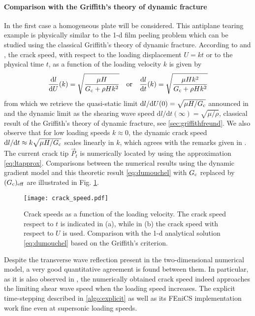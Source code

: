 \paragraph{Comparison with the Griffith's theory of dynamic fracture} In the first case a homogeneous plate will be considered. This antiplane tearing example is physically similar to the 1-d film peeling problem which can be studied using the classical Griffith's theory of dynamic fracture. According to \cite{DumouchelMarigoCharlotte:2008} and \cite{BourdinFrancfortMarigo:2008}, the crack speed, with respect to the loading displacement $U=kt$ or to the physical time $t$, as a function of the loading velocity $k$ is given by
\begin{equation} \label{eq:dumouchel}
\frac{\mathrm{d} l}{\mathrm{d} U}(k)=\sqrt{\frac{\mu H}{G_\mathrm{c}+\rho Hk^2}}\quad\text{or}\quad\frac{\mathrm{d} l}{\mathrm{d} t}(k)=\sqrt{\frac{\mu Hk^2}{G_\mathrm{c}+\rho Hk^2}}
\end{equation}
from which we retrieve the quasi-static limit $\mathrm{d} l/\mathrm{d} U(0)=\sqrt{\mu H/G_\mathrm{c}}$ announced in \cite{BourdinFrancfortMarigo:2008} and the dynamic limit as the shearing wave speed $\mathrm{d} l/\mathrm{d} t(\infty)=\sqrt{\mu/\rho}$, classical result of the Griffith's theory of dynamic fracture, see \cref{sec:griffithfreund}. We also observe that for low loading speeds $k\approx 0$, the dynamic crack speed $\mathrm{d} l/\mathrm{d} t\approx k\sqrt{\mu H/G_\mathrm{c}}$ scales linearly in $k$, which agrees with the remarks given in \cite{Bourdin:2011}. The current crack tip $\vec{P}_t$ is numerically located by using the approximation \eqref{eq:ltapprox}. Comparisons between the numerical results using the dynamic gradient model and this theoretic result \eqref{eq:dumouchel} with $G_\mathrm{c}$ replaced by $(G_\mathrm{c})_\mathrm{eff}$ are illustrated in Fig. \ref{fig:mode3}.
\begin{figure}[htbp]
\centering
\texttt{[image: crack\_speed.pdf]}
\caption{Crack speeds as a function of the loading velocity. The crack speed respect to $t$ is indicated in (a), while in (b) the crack speed with respect to $U$ is used. Comparison with the 1-d analytical solution \eqref{eq:dumouchel} based on the Griffith's criterion.} \label{fig:mode3}
\end{figure}
Despite the transverse wave reflection present in the two-dimensional numerical model, a very good quantitative agreement is found between them. In particular, as it is also observed in \cite{Bourdin:2011}, the numerically obtained crack speed indeed approaches the limiting shear wave speed when the loading speed increases. The explicit time-stepping described in \cref{algo:explicit} as well as its FEniCS implementation work fine even at supersonic loading speeds.

